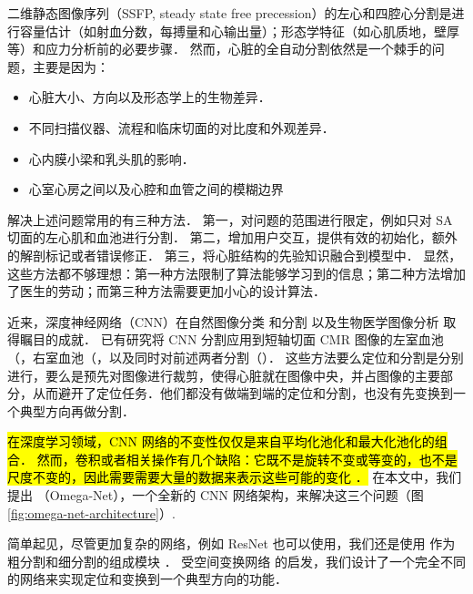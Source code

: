 

二维静态图像序列（SSFP, steady state free precession）的左心和四腔心分割是进行容量估计（如射血分数，每搏量和心输出量）；形态学特征（如心肌质地，壁厚等）和应力分析\citep{Peng2016}前的必要步骤．
然而，心脏的全自动分割依然是一个棘手的问题，主要是因为：

\begin{itemize}
\item 心脏大小、方向以及形态学上的生物差异．
\item 不同扫描仪器、流程和临床切面的对比度和外观差异．
\item 心内膜小梁和乳头肌的影响．
\item 心室心房之间以及心腔和血管之间的模糊边界
\end{itemize}

解决上述问题常用的有三种方法．
第一，对问题的范围进行限定，例如只对 SA 切面的左心肌和血池进行分割．
第二，增加用户交互，提供有效的初始化，额外的解剖标记或者错误修正．
第三，将心脏结构的先验知识融合到模型中．
显然，这些方法都不够理想：第一种方法限制了算法能够学习到的信息；第二种方法增加了医生的劳动；而第三种方法需要更加小心的设计算法． 

近来，深度神经网络（CNN）在自然图像分类 \citep{Krizhevsky2012,Simonyan2015} 和分割 \citep{Long2015,Noh2015,Yu2016} 以及生物医学图像分析 \citep{Ronneberger2015,Xie2015} 取得瞩目的成就．
已有研究将 CNN 分割应用到短轴切面 CMR 图像的左室血池（\citep{Tan2016,Poudel2016a,Tan2017}，右室血池（\citep{Luo2016}，以及同时对前述两者分割（\citep{Tran2016,Lieman-Sifry2017,Vigneault2017}）．
这些方法要么定位和分割是分别进行\citep{Tan2016, Poudel2016a, Tan2017, Luo2016}，要么是预先对图像进行裁剪，使得心脏就在图像中央，并占图像的主要部分，从而避开了定位任务\hl{\citep{Tran2016, Lieman-Sifry2017, Vigneault2017}}．他们都没有做端到端的定位和分割，也没有先变换到一个典型方向再做分割．



\hl{
在深度学习领域，CNN 网络的不变性仅仅是来自平均化池化和最大化池化的组合．
然而，卷积或者相关操作有几个缺陷：它既不是旋转不变或等变的，也不是尺度不变的，因此需要需要大量的数据来表示这些可能的变化 \citep{Sifre2013, Dieleman2015}．
}
在本文中，我们提出 \omeganet{}（Omega-Net），一个全新的 CNN 网络架构，来解决这三个问题（图 \ref{fig:omega-net-architecture}）.

简单起见，尽管更加复杂的网络，例如 ResNet \citep{He2016} 也可以使用，我们还是使用 \UNet{} 作为粗分割和细分割的组成模块 \citep{Ronneberger2015}．
受空间变换网络 \citep{Jaderberg2015} 的启发，我们设计了一个完全不同的网络来实现定位和变换到一个典型方向的功能．

